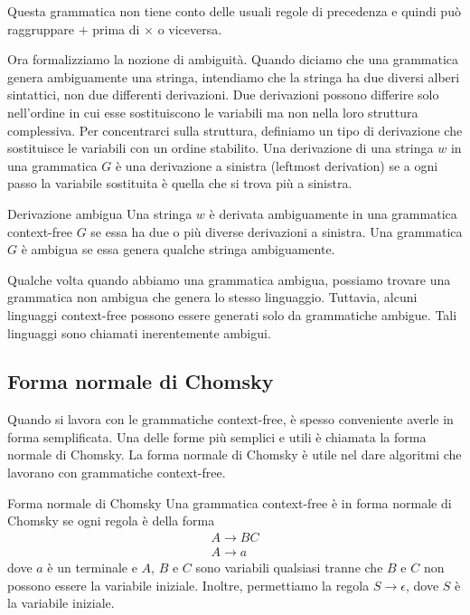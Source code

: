 Questa grammatica non tiene conto delle usuali regole di precedenza e quindi può raggruppare $+$ prima di $\times$ o viceversa.

Ora formalizziamo la nozione di ambiguità. Quando diciamo che una grammatica genera ambiguamente una stringa, intendiamo che la stringa ha due diversi alberi sintattici, non due differenti derivazioni. Due derivazioni possono differire solo nell'ordine in cui esse sostituiscono le variabili ma non nella loro struttura complessiva. Per concentrarci sulla struttura, definiamo un tipo di derivazione che sostituisce le variabili con un ordine stabilito. Una derivazione di una stringa $w$ in una grammatica $G$ è una derivazione a sinistra (leftmost derivation) se a ogni passo la variabile sostituita è quella che si trova più a sinistra.

\begin{Definition}{Derivazione ambigua}{}
Una stringa $w$ è derivata ambiguamente in una grammatica context-free $G$ se essa ha due o più diverse derivazioni a sinistra. Una grammatica $G$ è ambigua se essa genera qualche stringa ambiguamente.
\end{Definition}

Qualche volta quando abbiamo una grammatica ambigua, possiamo trovare una grammatica non ambigua che genera lo stesso linguaggio. Tuttavia, alcuni linguaggi context-free possono essere generati solo da grammatiche ambigue. Tali linguaggi sono chiamati inerentemente ambigui.

\subsection{Forma normale di Chomsky}
Quando si lavora con le grammatiche context-free, è spesso conveniente averle in forma semplificata. Una delle forme più semplici e utili è chiamata la forma normale di Chomsky. La forma normale di Chomsky è utile nel dare algoritmi che lavorano con grammatiche context-free.

\begin{Definition}{Forma normale di Chomsky}{}
Una grammatica context-free è in forma normale di Chomsky se ogni regola è della forma
\begin{gather*}
    A\to BC\\
    A\to a
\end{gather*}
dove $a$ è un terminale e $A$, $B$ e $C$ sono variabili qualsiasi tranne che $B$ e $C$ non possono essere la variabile iniziale. Inoltre, permettiamo la regola $S\to \epsilon$, dove $S$ è la variabile iniziale.
\end{Definition}

